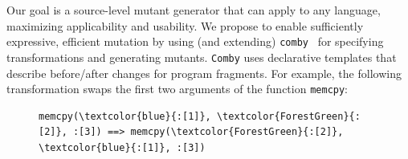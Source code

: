 Our goal is a source-level mutant generator that can apply to any language,
maximizing applicability and usability.
%
%
%
We propose to enable sufficiently expressive, efficient mutation by using (and extending) {\tt comby}~\cite{comby-github, rvt-ppc} for specifying
transformations and generating mutants. {\tt Comby} uses
declarative templates that describe before/after changes for program fragments. For example, the following transformation swaps the first two arguments of the function {\tt memcpy}:

\begin{figure}[!h]
\centering
\begin{BVerbatim}[commandchars=\\\{\}]
memcpy(\textcolor{blue}{:[1]}, \textcolor{ForestGreen}{:[2]}, :[3]) ==> memcpy(\textcolor{ForestGreen}{:[2]}, \textcolor{blue}{:[1]}, :[3])
\end{BVerbatim}
\end{figure}

